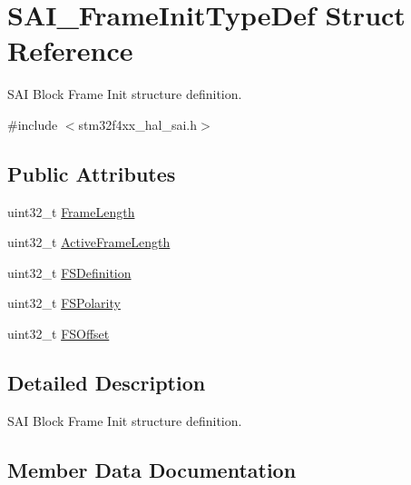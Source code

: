 \hypertarget{struct_s_a_i___frame_init_type_def}{}\section{S\+A\+I\+\_\+\+Frame\+Init\+Type\+Def Struct Reference}
\label{struct_s_a_i___frame_init_type_def}


S\+AI Block Frame Init structure definition.  




{\ttfamily \#include $<$stm32f4xx\+\_\+hal\+\_\+sai.\+h$>$}

\subsection*{Public Attributes}
\begin{DoxyCompactItemize}
\item 
uint32\+\_\+t \hyperlink{struct_s_a_i___frame_init_type_def_a904049acbd621e7e737e113489278b60}{Frame\+Length}
\item 
uint32\+\_\+t \hyperlink{struct_s_a_i___frame_init_type_def_a3ca18b96223b5d7778b56d22e206ca02}{Active\+Frame\+Length}
\item 
uint32\+\_\+t \hyperlink{struct_s_a_i___frame_init_type_def_a7a73667f43364ab89f20dcac482ed911}{F\+S\+Definition}
\item 
uint32\+\_\+t \hyperlink{struct_s_a_i___frame_init_type_def_a5afca722951634a6e86a4453a0899cc5}{F\+S\+Polarity}
\item 
uint32\+\_\+t \hyperlink{struct_s_a_i___frame_init_type_def_ab226d4d8ac8167cf9a4b12786ac18c2b}{F\+S\+Offset}
\end{DoxyCompactItemize}


\subsection{Detailed Description}
S\+AI Block Frame Init structure definition. 

\subsection{Member Data Documentation}
